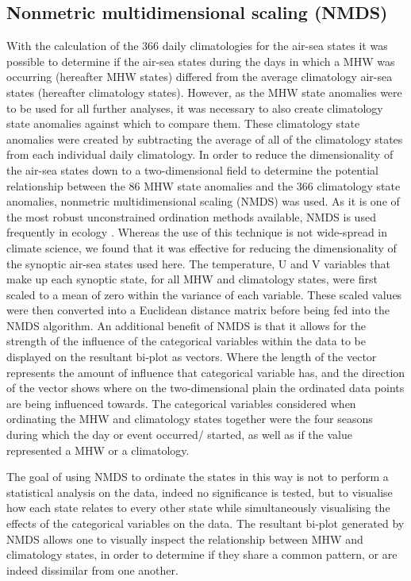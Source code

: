 \documentclass[a4paper,10pt,review]{elsarticle}
\begin{document}
\subsection{Nonmetric multidimensional scaling (NMDS)}
With the calculation of the 366 daily climatologies for the air-sea states it was possible to determine if the air-sea states during the days in which a MHW was occurring (hereafter MHW states) differed from the average climatology air-sea states (hereafter climatology states). However, as the MHW state anomalies were to be used for all further analyses, it was necessary to also create climatology state anomalies against which to compare them. These climatology state anomalies were created by subtracting the average of all of the climatology states from each individual daily climatology. In order to reduce the dimensionality of the air-sea states down to a two-dimensional field to determine the potential relationship between the 86 MHW state anomalies and the 366 climatology state anomalies, nonmetric multidimensional scaling (NMDS) was used. As it is one of the most robust unconstrained ordination methods available, NMDS is used frequently in ecology \citep{Minchin1987}. Whereas the use of this technique is not wide-spread in climate science, we found that it was effective for reducing the dimensionality of the synoptic air-sea states used here. The temperature, U and V variables that make up each synoptic state, for all MHW and climatology states, were first scaled to a mean of zero within the variance of each variable. These scaled values were then converted into a Euclidean distance matrix before being fed into the NMDS algorithm. An additional benefit of NMDS is that it allows for the strength of the influence of the categorical variables within the data to be displayed on the resultant bi-plot as vectors. Where the length of the vector represents the amount of influence that categorical variable has, and the direction of the vector shows where on the two-dimensional plain the ordinated data points are being influenced towards. The categorical variables considered when ordinating the MHW and climatology states together were the four seasons during which the day or event occurred/ started, as well as if the value represented a MHW or a climatology.

The goal of using NMDS to ordinate the states in this way is not to perform a statistical analysis on the data, indeed no significance is tested, but to visualise how each state relates to every other state while simultaneously visualising the effects of the categorical variables on the data. The resultant bi-plot generated by NMDS allows one to visually inspect the relationship between MHW and climatology states, in order to determine if they share a common pattern, or are indeed dissimilar from one another.
\end{document}
